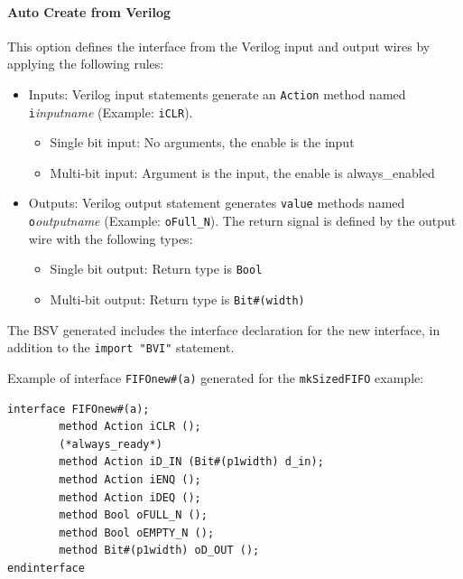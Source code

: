 \documentclass{article}
\newcommand{\te}[1]{\texttt{#1}}
\begin{document}


\paragraph{Auto Create from Verilog}

This  option  defines the interface from the Verilog input and output
wires by applying the following rules:
\begin{itemize}
\item Inputs:  Verilog input statements generate an \te{Action}
method  named \te{i}{\em inputname} (Example: \te{iCLR}).
\begin{itemize}
\item Single bit input: No arguments, the enable is the input
\item Multi-bit input: Argument is the input, the  enable is always\_enabled
\end{itemize}
\item Outputs: Verilog output statement generates \te{value} methods
 named \te{o}{\em outputname} (Example:
\te{oFull\_N}).
 The return signal is defined by the output wire with the following types:
\begin{itemize}
\item Single bit output: Return type is \te{Bool}
\item Multi-bit output: Return type is \te{Bit\#(width)}
\end{itemize}
\end{itemize}

The  BSV generated   includes the interface declaration for the new
interface, in addition to the \te{import "BVI"} statement.

Example of  interface \te{FIFOnew\#(a)} generated for the
\te{mkSizedFIFO} example:
\begin{verbatim}
interface FIFOnew#(a);
        method Action iCLR ();
        (*always_ready*)
        method Action iD_IN (Bit#(p1width) d_in);
        method Action iENQ ();
        method Action iDEQ ();
        method Bool oFULL_N ();
        method Bool oEMPTY_N ();
        method Bit#(p1width) oD_OUT ();
endinterface
\end{verbatim}

\end{document}
